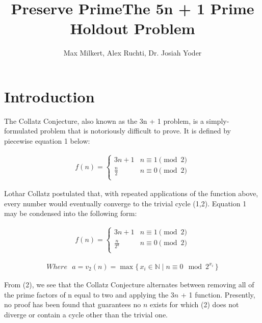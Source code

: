 \documentclass{article}
\title{Preserve Prime}
\begin{document}
\title{The 5n + 1 Prime Holdout Problem}
\author{Max Milkert, Alex Ruchti, Dr. Josiah Yoder}
\maketitle
\section{Introduction}
The Collatz Conjecture, also known as the 3n + 1 problem, is a simply-formulated problem that is notoriously difficult to prove. It is defined by piecewise equation 1 below:


\begin{ceqn}
\begin{align}
    f(n) = \begin{cases} 
      3n + 1 & n \equiv 1 \pmod{2} \\
      \frac{n}{2} & n \equiv 0 \pmod{2} \\
   \end{cases}
\end{align}
\end{ceqn}


Lothar Collatz postulated that, with repeated applications of the function above, every number would eventually converge to the trivial cycle (1,2). Equation 1 may be condensed into the following form:

\begin{ceqn}
\begin{align}
    f(n) = \begin{cases} 
      3n + 1 & n \equiv 1 \pmod{2} \\
      \frac{n}{2^a} & n \equiv 0 \pmod{2} \\
   \end{cases}
\end{align}
\end{ceqn}


\begin{ceqn}
\begin{align*}
Where \text{ }a = v_2(n) = \max\{\, x_i \in \mathbb{N} \mid n \equiv 0 \mod{2^{x_i}} \,\}
\end{align*}
\end{ceqn}
From (2), we see that the Collatz Conjecture alternates between removing all of the prime factors of n equal to two and applying the 3$n$ + 1 function. Presently, no proof has been found that guarantees no $n$ exists for which (2) does not diverge or contain a cycle other than the trivial one. 
\end{document}
